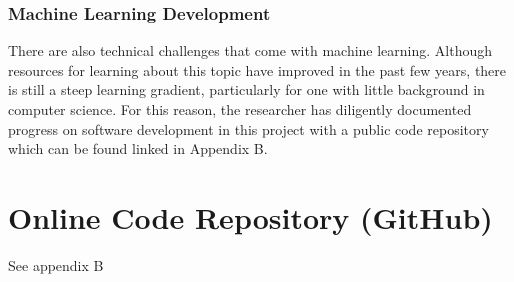 \subsubsection{Machine Learning Development}
There are also technical challenges that come with machine learning. Although resources for learning about this topic have improved in the past few years, there is still a steep learning gradient, particularly for one with little background in computer science. For this reason, the researcher has diligently documented progress on software development in this project with a public code repository which can be found linked in Appendix B. 

\section{Online Code Repository (GitHub)}
See appendix B
